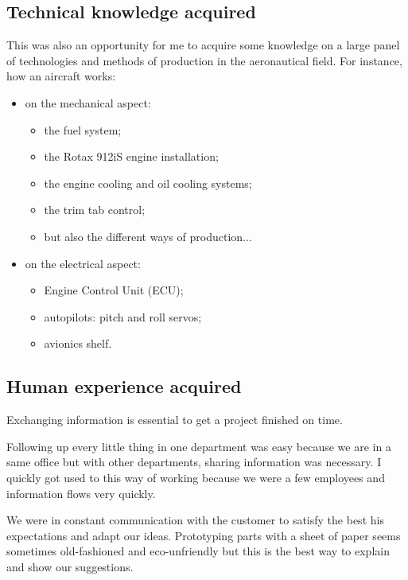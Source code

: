 \documentclass[11pt,a4paper]{article}
\begin{document}
\subsection{Technical knowledge acquired}
This was also an opportunity for me to acquire some knowledge on a large panel of technologies and methods of production in the aeronautical field. For instance, how an aircraft works:
\begin{itemize}
\setlength{\itemsep}{0pt}
\item on the mechanical aspect:
\begin{itemize}
\setlength{\itemsep}{0pt}
\item the fuel system;
\item the Rotax 912iS engine installation;
\item the engine cooling and oil cooling systems;
\item the trim tab control;
\item but also the different ways of production...
\end{itemize}
\item on the electrical aspect:
\begin{itemize}
\setlength{\itemsep}{0pt}
\item Engine Control Unit (ECU);
\item autopilots: pitch and roll servos;
\item avionics shelf.
\end{itemize}
\end{itemize}

\subsection{Human experience acquired}
Exchanging information is essential to get a project finished on time. 

\bigskip

Following up every little thing in one department was easy because we are in a same office but with other departments, sharing information was necessary. I quickly got used to this way of working because we were a few employees and information flows very quickly.

\bigskip

We were in constant communication with the customer to satisfy the best his expectations and adapt our ideas. Prototyping parts with a sheet of paper seems sometimes old-fashioned and eco-unfriendly but this is the best way to explain and show our suggestions.
\end{document}
